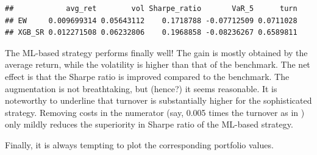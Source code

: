 \documentclass[]{krantz}
\theoremstyle{definition}
\theoremstyle{definition}
\theoremstyle{definition}
\theoremstyle{remark}
\begin{document}
\begin{verbatim}
##            avg_ret        vol Sharpe_ratio       VaR_5      turn
## EW     0.009699314 0.05643112    0.1718788 -0.07712509 0.0711028
## XGB_SR 0.012271508 0.06232806    0.1968858 -0.08236267 0.6589811
\end{verbatim}

\normalsize

The ML-based strategy performs finally well! The gain is mostly obtained
by the average return, while the volatility is higher than that of the
benchmark. The net effect is that the Sharpe ratio is improved compared
to the benchmark. The augmentation is not breathtaking, but (hence?) it
seems reasonable. It is noteworthy to underline that turnover is
substantially higher for the sophisticated strategy. Removing costs in
the numerator (say, 0.005 times the turnover as in
\citet{goto2015improving}) only mildly reduces the superiority in Sharpe
ratio of the ML-based strategy.

Finally, it is always tempting to plot the corresponding portfolio
values.

\footnotesize
\end{document}
